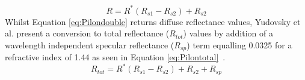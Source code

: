 \begin{equation}
    R = R^*(R_{s1} - R_{s2}) + R_{s2}
\label{eq:Pilondouble}
\end{equation}
Whilst Equation \eqref{eq:Pilondouble} returns diffuse reflectance values, Yudovsky et al. present a conversion to total reflectance ($R_{tot}$) values by addition of a wavelength independent specular reflectance ($R_{sp}$) term equalling 0.0325 for a refractive index of 1.44 as seen in Equation \eqref{eq:Pilontotal}~\citep{Yudovsky2011a}.
\begin{equation}
    R_{tot} = R^*(R_{s1} - R_{s2}) + R_{s2} +R_{sp}
\label{eq:Pilontotal}
\end{equation}

